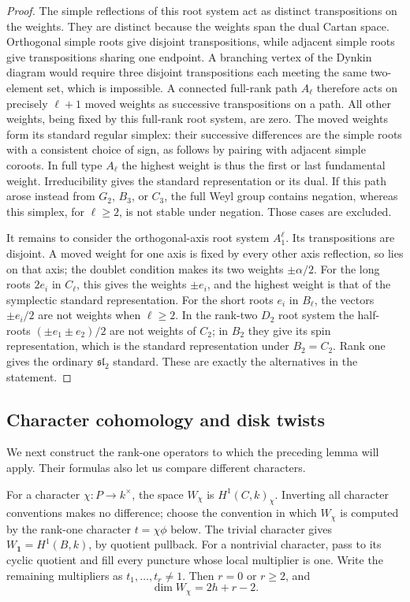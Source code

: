 \documentclass[11pt]{article}
\theoremstyle{plain}
\theoremstyle{definition}
\theoremstyle{remark}
\numberwithin{equation}{section}
\begin{document}
\begin{proof}
The simple reflections of this root system act as distinct
transpositions on the weights.  They are distinct because the weights
span the dual Cartan space.  Orthogonal simple roots give disjoint
transpositions, while adjacent simple roots give transpositions sharing
one endpoint.  A branching vertex of the Dynkin diagram would require
three disjoint transpositions each meeting the same two-element set,
which is impossible.  A connected full-rank path $A_\ell$ therefore
acts on precisely $\ell+1$ moved weights as successive transpositions
on a path.  All other weights, being fixed by this full-rank root system,
are zero.  The moved weights form its standard regular simplex: their
successive differences are the simple roots with a consistent choice
of sign, as follows by pairing with adjacent simple coroots.  In full
type $A_\ell$ the highest weight is thus the first or last fundamental
weight.  Irreducibility gives the standard representation or its dual.
If this path arose instead from $G_2$, $B_3$, or $C_3$, the full Weyl
group contains negation, whereas this simplex, for $\ell\ge2$, is not
stable under negation.  Those cases are excluded.

It remains to consider the orthogonal-axis root system $A_1^\ell$.
Its transpositions are disjoint.  A moved weight for one axis is fixed
by every other axis reflection, so lies on that axis; the doublet
condition makes its two weights $\pm\alpha/2$.  For the long roots
$2e_i$ in $C_\ell$, this gives the weights $\pm e_i$, and the highest
weight is that of the symplectic standard representation.  For the
short roots $e_i$ in $B_\ell$, the vectors $\pm e_i/2$ are not weights
when $\ell\ge2$.  In the rank-two $D_2$ root system the half-roots
$(\pm e_1\pm e_2)/2$ are not weights of $C_2$; in $B_2$ they give its
spin representation, which is the standard representation under
$B_2=C_2$.  Rank one gives the ordinary $\mathfrak{sl}_2$ standard.
These are exactly the alternatives in the statement.
\end{proof}

\subsection{Character cohomology and disk twists}

We next construct the rank-one operators to which the preceding lemma
will apply.  Their formulas also let us compare different characters.

For a character $\chi:P\to k^\times$, the space
$W_\chi$ is $H^1(C,k)_\chi$.  Inverting all character conventions makes no
difference; choose the convention in which $W_\chi$ is computed by the
rank-one character $t=\chi\phi$ below.  The trivial character gives
$W_{\mathbf1}=H^1(B,k)$, by quotient pullback.  For a nontrivial
character, pass to its cyclic quotient and fill every puncture whose
local multiplier is one.  Write the remaining multipliers as
$t_1,\ldots,t_r\ne1$.  Then $r=0$ or $r\ge2$, and
\begin{equation}\label{p4:character-dimension}
 \dim W_\chi=2h+r-2.
\end{equation}
\end{document}
